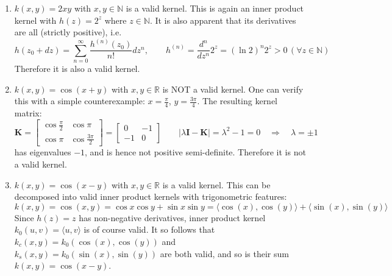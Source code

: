 \documentclass[a4paper, 10pt]{article}
\begin{document}
\begin{enumerate}[label=(\alph*)]
\begin{enumerate}[label=(\arabic*)]
        \item $k(x,y) = 2xy$ with $x,y\in \mathbb{N}$ is a valid kernel. This is again an inner product kernel with $h(z) = 2^z$ where $z \in \mathbb{N}$. It is also apparent that its derivatives are all (strictly positive), i.e.
        \begin{equation}
            h(z_0 + dz) = \sum_{n=0}^\infty \frac{h^{(n)}(z_0)}{n!}dz^n,\qquad h^{(n)} = \frac{d^n}{dz^n} 2^z = (\ln 2)^n 2^z > 0 \, (\forall z \in \mathbb{N})
        \end{equation}
        Therefore it is also a valid kernel.
        
        \item $k(x,y) = \cos(x+y)$ with $x,y \in \mathbb{R}$ is NOT a valid kernel. One can verify this with a simple counterexample: $x = \frac{\pi}{4}$, $y=\frac{3\pi}{4}$. The resulting kernel matrix:
        \begin{equation}
            \mathbf{K} = \begin{bmatrix}
                \cos \frac{\pi}{2} & \cos \pi \\ \cos \pi & \cos \frac{3\pi}{2}
            \end{bmatrix} = \begin{bmatrix}
                0 & -1 \\ -1 & 0
            \end{bmatrix}\qquad 
            |\lambda \mathbf{I} - \mathbf{K}| = \lambda^2 - 1 = 0\quad \Longrightarrow\quad \lambda = \pm 1
        \end{equation}
        has eigenvalues $-1$, and is hence not positive semi-definite. Therefore it is not a valid kernel.
        
        \item $k(x,y) = \cos(x - y)$ with $x,y \in \mathbb{R}$ is a valid kernel. This can be decomposed into valid inner product kernels with trigonometric features:
        \begin{equation}
            k(x,y) = \cos(x,y) = \cos x \cos y + \sin x \sin y = \langle \cos(x), \cos(y) \rangle + \langle \sin(x), \sin(y) \rangle
        \end{equation}
        Since $h(z) = z$ has non-negative derivatives, inner product kernel $k_0(u,v) = \langle u, v\rangle$ is of course valid. It so follows that $k_c(x, y) = k_0(\cos(x), \cos(y))$ and $k_s(x,y) = k_0(\sin(x), \sin(y))$ are both valid, and so is their sum $k(x,y) = \cos(x - y)$.
        

\end{enumerate}
\end{enumerate}
\end{document}
